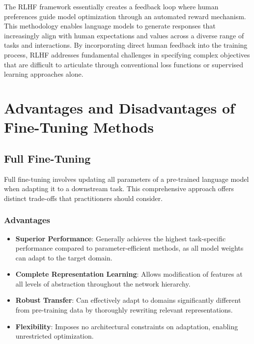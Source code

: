 The RLHF framework essentially creates a feedback loop where human preferences guide model optimization through an automated reward mechanism. This methodology enables language models to generate responses that increasingly align with human expectations and values across a diverse range of tasks and interactions. By incorporating direct human feedback into the training process, RLHF addresses fundamental challenges in specifying complex objectives that are difficult to articulate through conventional loss functions or supervised learning approaches alone.

\section{Advantages and Disadvantages of Fine-Tuning Methods}

\subsection{Full Fine-Tuning}

Full fine-tuning involves updating all parameters of a pre-trained language model when adapting it to a downstream task. This comprehensive approach offers distinct trade-offs that practitioners should consider.

\subsubsection{Advantages}
\begin{itemize}
    \item \textbf{Superior Performance}: Generally achieves the highest task-specific performance compared to parameter-efficient methods, as all model weights can adapt to the target domain.
    \item \textbf{Complete Representation Learning}: Allows modification of features at all levels of abstraction throughout the network hierarchy.
    \item \textbf{Robust Transfer}: Can effectively adapt to domains significantly different from pre-training data by thoroughly rewriting relevant representations.
    \item \textbf{Flexibility}: Imposes no architectural constraints on adaptation, enabling unrestricted optimization.
\end{itemize}

